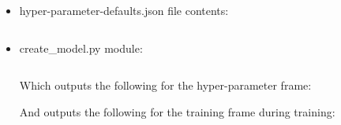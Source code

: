 \documentclass[./project-report/src/latex/project-report.tex]{subfiles}
\begin{document}
\begin{itemize}
    \item hyper-parameter-defaults.json file contents:
        \inputminted{json}{./school_project/frames/hyper-parameter-defaults.json}
    \item create\_model.py module:
        \inputminted{python}{./school_project/frames/create_model.py}
        
        Which outputs the following for the hyper-parameter frame:

        \pagebreak
        
        \begin{figure}[h!]
        \centering
        \end{figure}

        And outputs the following for the training frame during training:

        \begin{figure}[h!]
        \centering
        \end{figure}


\end{itemize}
\end{document}
